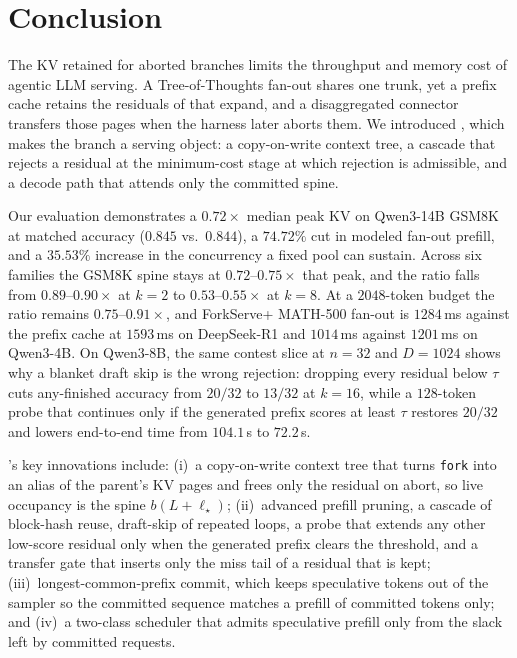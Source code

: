 \section{Conclusion}
\label{sec:conclusion}

The KV retained for aborted branches limits the throughput and memory cost of agentic LLM serving.
A Tree-of-Thoughts fan-out shares one trunk, yet a prefix cache retains the residuals of that expand, and a disaggregated connector transfers those pages when the harness later aborts them.
We introduced \sys, which makes the branch a serving object: a copy-on-write context tree, a cascade that rejects a residual at the minimum-cost stage at which rejection is admissible, and a decode path that attends only the committed spine.

Our evaluation demonstrates a $0.72\times$ median peak KV on Qwen3-14B GSM8K at matched accuracy ($0.845$ vs.\ $0.844$), a $74.72\%$ cut in modeled fan-out prefill, and a $35.53\%$ increase in the concurrency a fixed pool can sustain.
Across six families the GSM8K spine stays at $0.72$--$0.75\times$ that peak, and the ratio falls from $0.89$--$0.90\times$ at $k{=}2$ to $0.53$--$0.55\times$ at $k{=}8$.
At a $2048$-token budget the ratio remains $0.75$--$0.91\times$, and ForkServe+ MATH-500 fan-out is $1284$\,ms against the prefix cache at $1593$\,ms on DeepSeek-R1 and $1014$\,ms against $1201$\,ms on Qwen3-4B.
On Qwen3-8B, the same contest slice at $n{=}32$ and $D{=}1024$ shows why a blanket draft skip is the wrong rejection: dropping every residual below $\tau$ cuts any-finished accuracy from $20/32$ to $13/32$ at $k{=}16$, while a $128$-token probe that continues only if the generated prefix scores at least $\tau$ restores $20/32$ and lowers end-to-end time from $104.1$\,s to $72.2$\,s.

\sys's key innovations include: (i)~a copy-on-write context tree that turns \texttt{fork} into an alias of the parent's KV pages and frees only the residual on abort, so live occupancy is the spine $b(L+\ell_\star)$; (ii)~advanced prefill pruning, a cascade of block-hash reuse, draft-skip of repeated loops, a probe that extends any other low-score residual only when the generated prefix clears the threshold, and a transfer gate that inserts only the miss tail of a residual that is kept; (iii)~longest-common-prefix commit, which keeps speculative tokens out of the sampler so the committed sequence matches a prefill of committed tokens only; and (iv)~a two-class scheduler that admits speculative prefill only from the slack left by committed requests.

